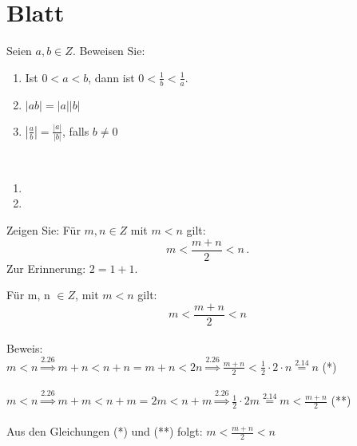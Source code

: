 \section{Blatt}

\begin{aufg}[6 Punkte]\label{kleiner}
Seien $a,b\in Z$. Beweisen Sie: 
\begin{enumerate}[label=$\mathrm{(\roman*)}$, ref=$\mathrm{\roman*}$]
\item\label{kleineri} Ist $0<a<b$, dann ist $0<\frac1b<\frac1a$.
\item $|ab| = |a||b|$
\item $\left| \frac{a}{b} \right| = \frac{|a|}{|b|}$, falls $b\not=0$
\end{enumerate}
\end{aufg}


\bigskip

\begin{lsg}\mbox{ }
\begin{enumerate}[label=$\mathrm{(\roman*)}$, ref=$\mathrm{\roman*}$]
\item 
\item 
\end{enumerate}
\end{lsg}

\bigskip



\begin{aufg}[4 Punkte]\label{mittel}
Zeigen Sie: Für $m,n\in Z$ mit $m<n$ gilt:
\[ m<\frac{m+n}{2} < n\,.\]
Zur Erinnerung: $2 = 1+1$.
\end{aufg}
 
\bigskip 
 
\begin{lsg}
Für m, n $ \in Z$, 
mit $m < n$ gilt:
\[m<\frac{m+n}{2}<n\] 
\\ Beweis:
\\ $m<n \overset{2.26}{\Rightarrow} m+n < n+n = m+n < 2n \overset{2.26}{\Rightarrow} \frac{m+n}{2}< \frac{1}{2}\cdot 2 \cdot n \overset{2.14}{=} n $ (*)
\\
\\$ m<n\overset{2.26}{\Rightarrow} m+m < n+m = 2m < n+m \overset{2.26}{\Rightarrow} \frac{1}{2}\cdot2m \overset{2.14}{=} m < \frac{m+n}{2} $ (**)
\\
\\ Aus den Gleichungen (*) und (**) folgt: $m<\frac{m+n}{2}<n$
\end{lsg}

